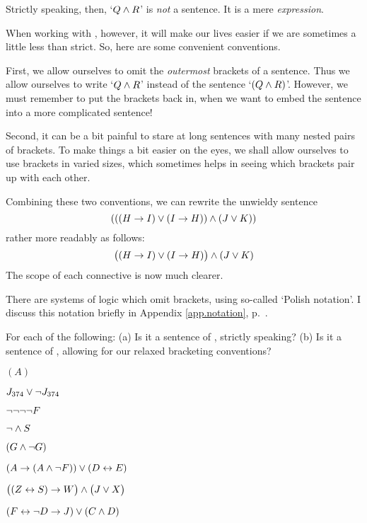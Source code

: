 Strictly speaking, then, `$Q \wedge R$' is \emph{not} a sentence. It is a mere \emph{expression}.

When working with \TFL, however, it will make our lives easier if we are sometimes a little less than strict. So, here are some convenient conventions.

First,  we allow ourselves to omit the \emph{outermost} brackets of a sentence. Thus we allow ourselves to write `$Q \wedge R$' instead of the sentence `$(Q \wedge R)$'. However, we must remember to put the brackets back in, when we want to embed the sentence into a more complicated sentence!

Second, it can be a bit painful to stare at long sentences with many nested pairs of brackets. To make things a bit easier on the eyes, we shall allow ourselves to use brackets in varied sizes, which sometimes helps in seeing which brackets pair up with each other.


Combining these two conventions, we can rewrite the unwieldy sentence
$$(((H \rightarrow I) \vee (I \rightarrow H)) \wedge (J \vee K))$$
rather more readably as follows:
$$\bigl( (H \rightarrow I) \vee (I \rightarrow H) \bigr) \wedge (J \vee K)$$
The scope of each connective is now much clearer.

There are systems of logic which omit brackets, using so-called `Polish notation'. I discuss this notation briefly in Appendix \ref{app.notation}, p.~\pageref{polish}. 


\practiceproblems

\solutions
\problempart
\label{pr.wiffTFL}
For each of the following: (a) Is it a sentence of \TFL, strictly speaking? (b) Is it a sentence of \TFL, allowing for our relaxed bracketing conventions?
\begin{earg}
\item $(A)$
\item $J_{374} \vee \neg J_{374}$
\item $\neg \neg \neg \neg F$
\item $\neg \wedge S$
\item $(G \wedge \neg G)$
\item $(A \rightarrow (A \wedge \neg F)) \vee (D \leftrightarrow E)$
\item $\bigl( (Z \leftrightarrow S) \rightarrow W \bigr) \wedge \bigl(J \vee X\bigr)$
\item $(F \leftrightarrow \neg D \rightarrow J) \vee (C \wedge D)$
\end{earg}

